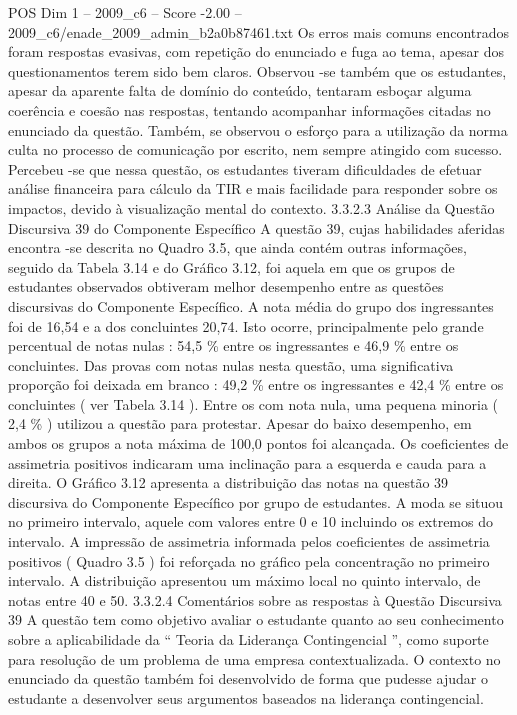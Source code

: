 \begin{textsample}{POS Dim 1 – 2009\_c6 – Score -2.00 – 2009\_c6/enade\_2009\_admin\_b2a0b87461.txt}
Os erros mais comuns encontrados foram respostas evasivas, com repetição do enunciado e fuga ao tema, apesar dos questionamentos terem sido bem claros.
Observou -se também que os estudantes, apesar da aparente falta de domínio do conteúdo, tentaram esboçar alguma coerência e coesão nas respostas, tentando acompanhar informações citadas no enunciado da questão.
Também, se observou o esforço para a utilização da norma culta no processo de comunicação por escrito, nem sempre atingido com sucesso.
Percebeu -se que nessa questão, os estudantes tiveram dificuldades de efetuar análise financeira para cálculo da TIR e mais facilidade para responder sobre os impactos, devido à visualização mental do contexto. 3.3.2.3 Análise da Questão Discursiva 39 do Componente Específico A questão 39, cujas habilidades aferidas encontra -se descrita no Quadro 3.5, que ainda contém outras informações, seguido da Tabela 3.14 e do Gráfico 3.12, foi aquela em que os grupos de estudantes observados obtiveram melhor desempenho entre as questões discursivas do Componente Específico.
A nota média do grupo dos ingressantes foi de 16,54 e a dos concluintes 20,74.
Isto ocorre, principalmente pelo grande percentual de notas nulas : 54,5 \% entre os ingressantes e 46,9 \% entre os concluintes.
Das provas com notas nulas nesta questão, uma significativa proporção foi deixada em branco : 49,2 \% entre os ingressantes e 42,4 \% entre os concluintes ( ver Tabela 3.14 ).
Entre os com nota nula, uma pequena minoria ( 2,4 \% ) utilizou a questão para protestar.
Apesar do baixo desempenho, em ambos os grupos a nota máxima de 100,0 pontos foi alcançada.
Os coeficientes de assimetria positivos indicaram uma inclinação para a esquerda e cauda para a direita.
O Gráfico 3.12 apresenta a distribuição das notas na questão 39 discursiva do Componente Específico por grupo de estudantes.
A moda se situou no primeiro intervalo, aquele com valores entre 0 e 10 incluindo os extremos do intervalo.
A impressão de assimetria informada pelos coeficientes de assimetria positivos ( Quadro 3.5 ) foi reforçada no gráfico pela concentração no primeiro intervalo.
A distribuição apresentou um máximo local no quinto intervalo, de notas entre 40 e 50. 3.3.2.4 Comentários sobre as respostas à Questão Discursiva 39 A questão tem como objetivo avaliar o estudante quanto ao seu conhecimento sobre a aplicabilidade da “ Teoria da Liderança Contingencial ”, como suporte para resolução de um problema de uma empresa contextualizada.
O contexto no enunciado da questão também foi desenvolvido de forma que pudesse ajudar o estudante a desenvolver seus argumentos baseados na liderança contingencial.

\end{textsample}
